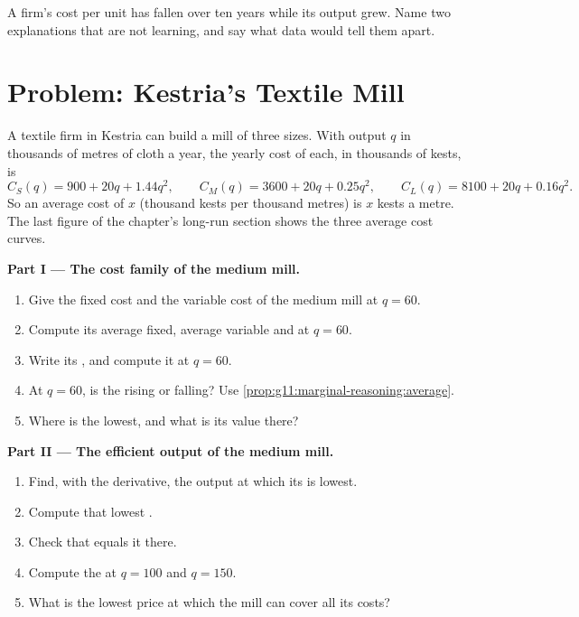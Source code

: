 \begin{exercise}[$\star\star\star$]\label{exo:g11:production-and-costs:15}
A firm's cost per unit has fallen over ten years while its output grew. Name two explanations that are not learning, and say what data would tell them apart.
\end{exercise}

\section{Problem: Kestria's Textile Mill}

\begin{problem}
\label{pb:g11:production-and-costs:1}
A textile firm in Kestria can build a mill of three sizes. With output $q$ in thousands of metres of cloth a year, the yearly cost of each, in thousands of kests, is
\[
C_S(q) = 900 + 20q + 1.44q^2, \qquad C_M(q) = 3600 + 20q + 0.25q^2, \qquad C_L(q) = 8100 + 20q + 0.16q^2.
\]
So an average cost of $x$ (thousand kests per thousand metres) is $x$ kests a metre. The last figure of the chapter's long-run section shows the three average
cost curves.

\medskip
\noindent\textbf{Part I --- The cost family of the medium mill.}
\begin{enumerate}
\item Give the fixed cost and the variable cost of the medium mill at $q = 60$.
\item Compute its average fixed, average variable and  at $q = 60$.
\item Write its , and compute it at $q = 60$.
\item At $q = 60$, is the  rising or falling? Use \cref{prop:g11:marginal-reasoning:average}.
\item Where is the  lowest, and what is its value there?
\end{enumerate}

\medskip
\noindent\textbf{Part II --- The efficient output of the medium mill.}
\begin{enumerate}[resume]
\item Find, with the derivative, the output at which its  is lowest.
\item Compute that lowest .
\item Check that  equals it there.
\item Compute the  at $q = 100$ and $q = 150$.
\item What is the lowest price at which the mill can cover all its costs?
\end{enumerate}


\end{problem}
